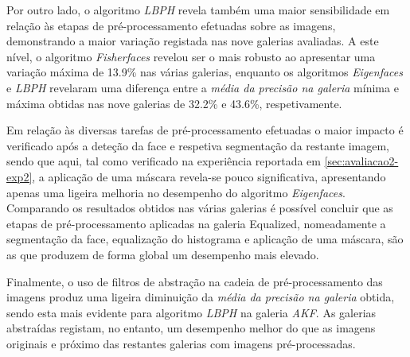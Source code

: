 Por outro lado, o algoritmo \textit{LBPH} revela também uma maior sensibilidade em relação às etapas de pré-processamento efetuadas sobre as imagens, demonstrando a maior variação registada nas nove galerias avaliadas. A este nível, o algoritmo \textit{Fisherfaces} revelou ser o mais robusto ao apresentar uma variação máxima de 13.9\% nas várias galerias, enquanto os algoritmos \textit{Eigenfaces} e \textit{LBPH} revelaram uma diferença entre a \textit{média da precisão na galeria} mínima e máxima obtidas nas nove galerias de 32.2\% e 43.6\%, respetivamente.

Em relação às diversas tarefas de pré-processamento efetuadas o maior impacto é verificado após a deteção da face e respetiva segmentação da restante imagem, sendo que aqui, tal como verificado na experiência reportada em \ref{sec:avaliacao2-exp2}, a aplicação de uma máscara revela-se pouco significativa, apresentando apenas uma ligeira melhoria no desempenho do algoritmo \textit{Eigenfaces}. Comparando os resultados obtidos nas várias galerias é possível concluir que as etapas de pré-processamento aplicadas na galeria Equalized, nomeadamente a segmentação da face, equalização do histograma e aplicação de uma máscara, são as que produzem de forma global um desempenho mais elevado.

Finalmente, o uso de filtros de abstração na cadeia de pré-processamento das imagens produz uma ligeira diminuição da \textit{média da precisão na galeria} obtida, sendo esta mais evidente para algoritmo \textit{LBPH} na galeria \textit{AKF}. As galerias abstraídas registam, no entanto, um desempenho melhor do que as imagens originais e próximo das restantes galerias com imagens pré-processadas.

